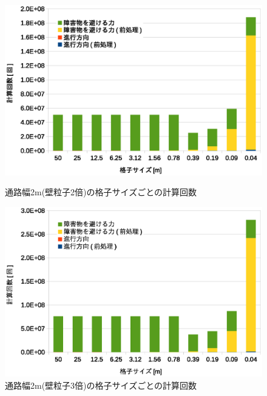 \begin{figure}[tb]
	\begin{minipage}[b]{0.48\columnwidth}
		\begin{center}
		\includegraphics[width=\columnwidth]{figure/5_result_2bai_times.eps}
		\caption{通路幅2m(壁粒子2倍)の格子サイズごとの計算回数}
		\label{fig:result_2bai_times}
		\end{center}
	\end{minipage}
	\hspace{0.04\columnwidth}
	\begin{minipage}[b]{0.48\columnwidth}
		\begin{center}
		\includegraphics[width=\columnwidth]{figure/5_result_3bai_times.eps}
		\caption{通路幅2m(壁粒子3倍)の格子サイズごとの計算回数}
		\label{fig:result_3bai_times}
		\end{center}
	\end{minipage}
\end{figure}
